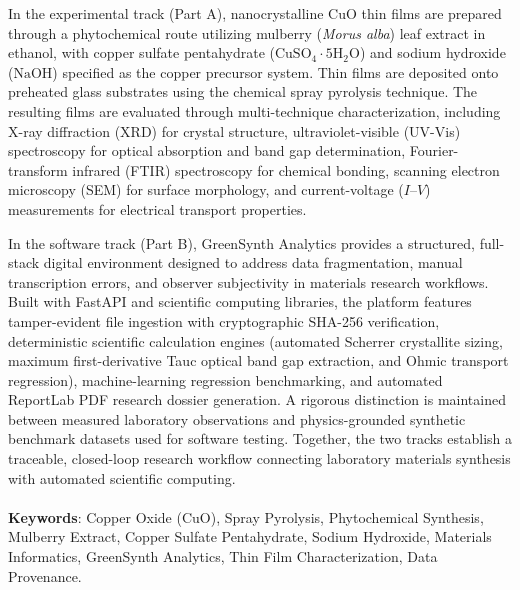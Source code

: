\documentclass[12pt,a4paper,oneside]{report}
\begin{document}
{{{In the experimental track (Part A), nanocrystalline $\text{CuO}$ thin films are prepared through a phytochemical route utilizing mulberry (\textit{Morus alba}) leaf extract in ethanol, with copper sulfate pentahydrate ($\text{CuSO}_4{\cdot}5\text{H}_2\text{O}$) and sodium hydroxide ($\text{NaOH}$) specified as the copper precursor system. Thin films are deposited onto preheated glass substrates using the chemical spray pyrolysis technique. The resulting films are evaluated through multi-technique characterization, including X-ray diffraction (XRD) for crystal structure, ultraviolet-visible (UV-Vis) spectroscopy for optical absorption and band gap determination, Fourier-transform infrared (FTIR) spectroscopy for chemical bonding, scanning electron microscopy (SEM) for surface morphology, and current-voltage ($I\text{--}V$) measurements for electrical transport properties.

In the software track (Part B), GreenSynth Analytics provides a structured, full-stack digital environment designed to address data fragmentation, manual transcription errors, and observer subjectivity in materials research workflows. Built with FastAPI and scientific computing libraries, the platform features tamper-evident file ingestion with cryptographic SHA-256 verification, deterministic scientific calculation engines (automated Scherrer crystallite sizing, maximum first-derivative Tauc optical band gap extraction, and Ohmic transport regression), machine-learning regression benchmarking, and automated ReportLab PDF research dossier generation. A rigorous distinction is maintained between measured laboratory observations and physics-grounded synthetic benchmark datasets used for software testing. Together, the two tracks establish a traceable, closed-loop research workflow connecting laboratory materials synthesis with automated scientific computing.\\
\\
\textbf{Keywords}: Copper Oxide ($\text{CuO}$), Spray Pyrolysis, Phytochemical Synthesis, Mulberry Extract, Copper Sulfate Pentahydrate, Sodium Hydroxide, Materials Informatics, GreenSynth Analytics, Thin Film Characterization, Data Provenance.



}}}
\end{document}

